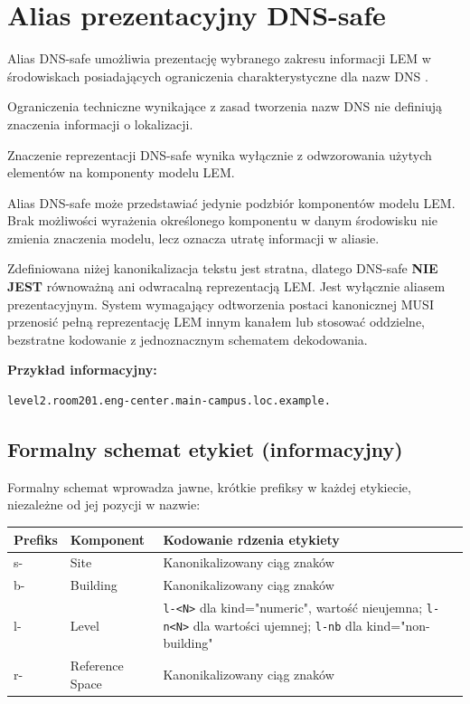 \section{Alias prezentacyjny DNS-safe}
\label{sec:reprezentacja-dns-safe}
Alias DNS-safe umożliwia prezentację wybranego zakresu informacji LEM w środowiskach posiadających ograniczenia charakterystyczne dla nazw DNS \cite{RFC1035}.

Ograniczenia techniczne wynikające z zasad tworzenia nazw DNS nie definiują znaczenia informacji o lokalizacji.

Znaczenie reprezentacji DNS-safe wynika wyłącznie z odwzorowania użytych elementów na komponenty modelu LEM.

Alias DNS-safe może przedstawiać jedynie podzbiór komponentów modelu LEM. Brak możliwości wyrażenia określonego komponentu w danym środowisku nie zmienia znaczenia modelu, lecz oznacza utratę informacji w aliasie.

Zdefiniowana niżej kanonikalizacja tekstu jest stratna, dlatego DNS-safe \textbf{NIE JEST} równoważną ani odwracalną reprezentacją LEM. Jest wyłącznie aliasem prezentacyjnym. System wymagający odtworzenia postaci kanonicznej MUSI przenosić pełną reprezentację LEM innym kanałem lub stosować oddzielne, bezstratne kodowanie z jednoznacznym schematem dekodowania.

\noindent \textbf{Przykład informacyjny:}
\begin{verbatim}
level2.room201.eng-center.main-campus.loc.example.
\end{verbatim}

\subsection{Formalny schemat etykiet (informacyjny)}
\label{sec:schemat-etykiet}
Formalny schemat wprowadza jawne, krótkie prefiksy w każdej etykiecie, niezależne od jej pozycji w nazwie:

\begin{table}[h]
\centering
\small
\begin{tabular}{|l|l|p{7cm}|}
\hline
\textbf{Prefiks} & \textbf{Komponent} & \textbf{Kodowanie rdzenia etykiety} \\ \hline
s- & Site & Kanonikalizowany ciąg znaków \\ \hline
b- & Building & Kanonikalizowany ciąg znaków \\ \hline
l- & Level & \texttt{l-<N>} dla kind="numeric", wartość nieujemna; \texttt{l-n<N>} dla wartości ujemnej; \texttt{l-nb} dla kind="non-building" \\ \hline
r- & Reference Space & Kanonikalizowany ciąg znaków \\ \hline
\end{tabular}
\end{table}

